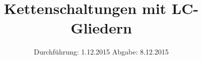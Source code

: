 

\subject{V 356}
\title{Kettenschaltungen mit LC-Gliedern}
\date{
  Durchführung: 1.12.2015
  \hspace{3em}
  Abgabe: 8.12.2015
}



\maketitle
\thispagestyle{empty}
\tableofcontents
\newpage






\newpage


\printbibliography


